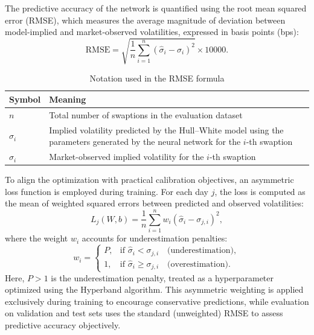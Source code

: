 {The predictive accuracy of the network is quantified using the root mean squared error (RMSE), which measures the average magnitude of deviation between model-implied and market-observed volatilities, expressed in basis points (bps):
\begin{equation}
	\text{RMSE} = \sqrt{\frac{1}{n}\sum_{i=1}^{n}(\hat{\sigma}_i - \sigma_i)^2} \times 10000.
\end{equation}

\begin{table}[H]
	\centering
	\caption{Notation used in the RMSE formula}
	\begin{tabular}{lp{12cm}}
		\toprule
		Symbol           & Meaning                                                                                                                            \\
		\midrule
		$n$              & Total number of swaptions in the evaluation dataset                                                                                \\
		$\hat{\sigma}_i$ & Implied volatility predicted by the Hull--White model using the parameters generated by the neural network for the $i$-th swaption \\
		$\sigma_i$       & Market-observed implied volatility for the $i$-th swaption                                                                         \\
		\bottomrule
	\end{tabular}
\end{table}

To align the optimization with practical calibration objectives, an asymmetric loss function is employed during training. For each day $j$, the loss is computed as the mean of weighted squared errors between predicted and observed volatilities:
\begin{equation}
	L_j(W, b) = \frac{1}{n} \sum_{i=1}^{n} w_i (\hat{\sigma}_i - \sigma_{j,i})^2,
\end{equation}
where the weight $w_i$ accounts for underestimation penalties:
\begin{equation}
	w_i =
	\begin{cases}
		P, & \text{if } \hat{\sigma}_i < \sigma_{j,i} \quad \text{(underestimation)},   \\
		1, & \text{if } \hat{\sigma}_i \geq \sigma_{j,i} \quad \text{(overestimation)}.
	\end{cases}
\end{equation}
Here, $P>1$ is the underestimation penalty, treated as a hyperparameter optimized using the Hyperband algorithm. This asymmetric weighting is applied exclusively during training to encourage conservative predictions, while evaluation on validation and test sets uses the standard (unweighted) RMSE to assess predictive accuracy objectively.

}
